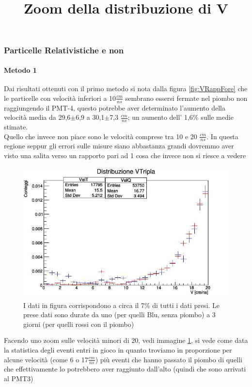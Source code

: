\documentclass[a4paper]{article}
\begin{document}
\subsubsection{Particelle Relativistiche e non}
\paragraph{Metodo 1}
Dai risultati ottenuti con il primo metodo si nota dalla figura \ref{fig:VRappFore} che le particelle con velocità inferiori a 10$\frac{cm}{ns}$ sembrano essersi fermate nel piombo non raggiungendo il PMT-4, questo potrebbe aver determinato l'aumento della velocità media da 29,6$\pm$6,9 a 30,1$\pm$7,3 $\frac{cm}{ns}$; un aumento dell' 1,6$\%$ sulle medie stimate.\\
Quello che invece non piace sono le velocità comprese tra 10 e 20 $\frac{cm}{ns}$. In questa regione seppur gli errori sulle misure siano abbastanza grandi dovremmo aver visto una salita verso un rapporto pari ad 1 cosa che invece non si riesce a vedere

\begin{figure}
\centering
\title{Zoom della distribuzione di V}
\begin{center}
\includegraphics[scale=0.3]{./immagini/TimeOFFlight/ZoomVel.jpg}
\caption{I dati in figura corrispondono a circa il 7$\%$ di tutti i dati presi. Le prese dati sono durate da uno (per quelli Blu, senza piombo) a 3 giorni (per quelli rossi con il piombo)}
\label{fig:ZoomV}
\end{center}
\end{figure}

Facendo uno zoom sulle velocità minori di 20, vedi immagine \ref{fig:ZoomV}, si vede come data la statistica degli eventi entri in gioco in quanto troviamo in proporzione per alcune velocità (come 6 o 17$\frac{cm}{ns}$) più eventi che hanno passato il piombo di quelli che effettivamente lo potrebbero aver raggiunto dall'alto (quindi che sono arrivati al PMT3)
\end{document}
